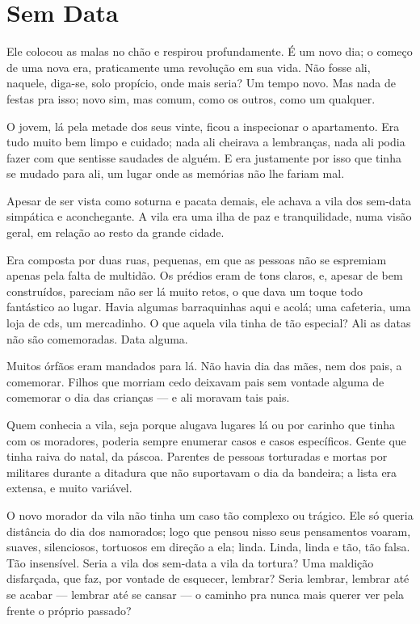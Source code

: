 \chapter{Sem Data}

Ele colocou as malas no chão e respirou profundamente. É um novo dia; o começo de uma nova era, praticamente uma revolução em sua vida. Não fosse ali, naquele, diga-se, solo propício, onde mais seria? Um tempo novo. Mas nada de festas pra isso; novo sim, mas comum, como os outros, como um qualquer.

O jovem, lá pela metade dos seus vinte, ficou a inspecionar o apartamento. Era tudo muito bem limpo e cuidado; nada ali cheirava a lembranças, nada ali podia fazer com que sentisse saudades de alguém. E era justamente por isso que tinha se mudado para ali, um lugar onde as memórias não lhe fariam mal.

Apesar de ser vista como soturna e pacata demais, ele achava a vila dos sem-data simpática e aconchegante. A vila era uma ilha de paz e tranquilidade, numa visão geral, em relação ao resto da grande cidade.

Era composta por duas ruas, pequenas, em que as pessoas não se espremiam apenas pela falta de multidão. Os prédios eram de tons claros, e, apesar de bem construídos, pareciam não ser lá muito retos, o que dava um toque todo fantástico ao lugar. Havia algumas barraquinhas aqui e acolá; uma cafeteria, uma loja de cds, um mercadinho. O que aquela vila tinha de tão especial? Ali as datas não são comemoradas. Data alguma.

Muitos órfãos eram mandados para lá. Não havia dia das mães, nem dos pais, a comemorar. Filhos que morriam cedo deixavam pais sem vontade alguma de comemorar o dia das crianças --- e ali moravam tais pais.

Quem conhecia a vila, seja porque alugava lugares lá ou por carinho que tinha com os moradores, poderia sempre enumerar casos e casos específicos. Gente que tinha raiva do natal, da páscoa. Parentes de pessoas torturadas e mortas por militares durante a ditadura que não suportavam o dia da bandeira; a lista era extensa, e muito variável.

O novo morador da vila não tinha um caso tão complexo ou trágico. Ele só queria distância do dia dos namorados; logo que pensou nisso seus pensamentos voaram, suaves, silenciosos, tortuosos em direção a ela; linda. Linda, linda e tão, tão falsa. Tão insensível. Seria a vila dos sem-data a vila da tortura? Uma maldição disfarçada, que faz, por vontade de esquecer, lembrar? Seria lembrar, lembrar até se acabar --- lembrar até se cansar --- o caminho pra nunca mais querer ver pela frente o próprio passado?

